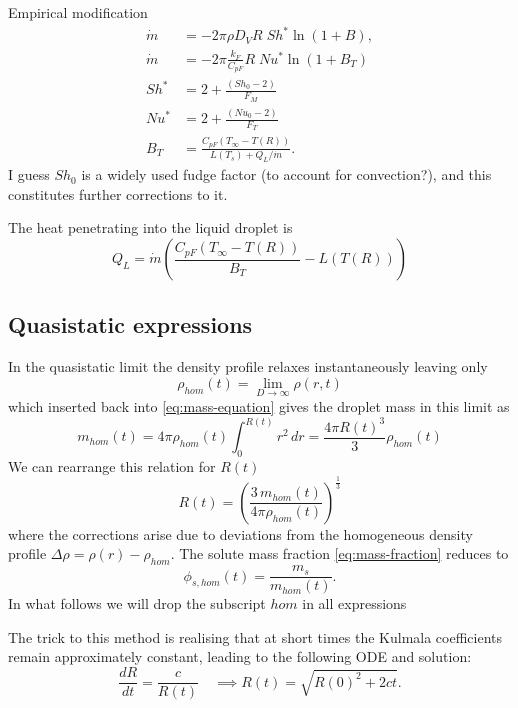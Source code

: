 \documentclass[12pt]{report}
\begin{document}
Empirical modification \cite{Abramzon1988}
\begin{align}
  \dot{m} &= - 2\pi \rho D_V R \; Sh^* \ln{(1 + B)}, \\
  \dot{m} &= - 2\pi \frac{k_F}{C_{pF}} R \; Nu^* \ln{(1 + B_T)} \\
  Sh^* &= 2 + \frac{(Sh_0 - 2)}{F_M} \\
  Nu^* &= 2 + \frac{(Nu_0 - 2)}{F_T} \\
  B_T &= \frac{C_{pF} (T_\infty - T(R))}{L(T_s) + Q_L / \dot{m}}.
\end{align}
I guess $Sh_0$ is a widely used fudge factor (to account for convection?), and this constitutes further corrections to it.

The heat penetrating into the liquid droplet is \cite{Abramzon1988}
\begin{equation}
  Q_L = \dot{m} \left( \frac{C_{pF} (T_\infty - T(R))}{B_T} - L(T(R)) \right)
\end{equation}

\subsection{Quasistatic expressions}

In the quasistatic limit the density profile relaxes instantaneously leaving only
\begin{equation}
  \rho_{hom}(t) = \lim_{D\to\infty}{\rho(r,t)}
\end{equation}
which inserted back into \eqref{eq:mass-equation} gives the droplet mass in this limit as
\begin{equation}
  m_{hom}(t) = 4\pi \rho_{hom}(t) \int_0^{R(t)} r^2 \, dr = \frac{4\pi R(t)^3}{3} \rho_{hom}(t)
\end{equation}
We can rearrange this relation for $R(t)$
\begin{equation}\label{eq:homogeneous-droplet-radius}
  R(t) = \left( \frac{3 \, m_{hom}(t)}{4\pi \rho_{hom}(t)} \right)^\frac{1}{3}
\end{equation}
where the corrections arise due to deviations from the homogeneous density profile $\Delta \rho = \rho(r) - \rho_{hom}$.
The solute mass fraction \eqref{eq:mass-fraction} reduces to
\begin{equation}\label{eq:homogeneous-solute-mass-fraction}
  \phi_{s,hom}(t) = \frac{m_s}{m_{hom}(t)}.
\end{equation}
In what follows we will drop the subscript $hom$ in all expressions

The trick to this method is realising that at short times the Kulmala coefficients remain approximately constant, leading to the following ODE and solution:
\begin{equation*}
  \frac{dR}{dt} = \frac{c}{R(t)} \quad \implies R(t) = \sqrt{R(0)^2 + 2ct}.
\end{equation*}
\end{document}
